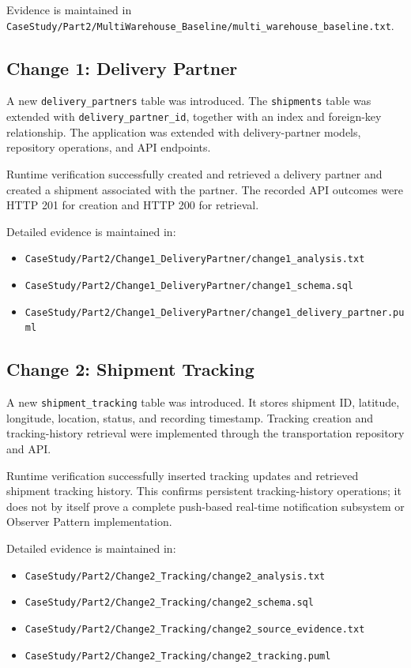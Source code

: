 \documentclass[12pt,a4paper]{article}
\begin{document}
Evidence is maintained in \texttt{CaseStudy/Part2/MultiWarehouse\_Baseline/multi\_warehouse\_baseline.txt}.

\subsection{Change 1: Delivery Partner}
A new \texttt{delivery\_partners} table was introduced. The \texttt{shipments} table was extended with \texttt{delivery\_partner\_id}, together with an index and foreign-key relationship. The application was extended with delivery-partner models, repository operations, and API endpoints.

Runtime verification successfully created and retrieved a delivery partner and created a shipment associated with the partner. The recorded API outcomes were HTTP 201 for creation and HTTP 200 for retrieval.

Detailed evidence is maintained in:
\begin{itemize}
    \item \texttt{CaseStudy/Part2/Change1\_DeliveryPartner/change1\_analysis.txt}
    \item \texttt{CaseStudy/Part2/Change1\_DeliveryPartner/change1\_schema.sql}
    \item \texttt{CaseStudy/Part2/Change1\_DeliveryPartner/change1\_delivery\_partner.puml}
\end{itemize}

\subsection{Change 2: Shipment Tracking}
A new \texttt{shipment\_tracking} table was introduced. It stores shipment ID, latitude, longitude, location, status, and recording timestamp. Tracking creation and tracking-history retrieval were implemented through the transportation repository and API.

Runtime verification successfully inserted tracking updates and retrieved shipment tracking history. This confirms persistent tracking-history operations; it does not by itself prove a complete push-based real-time notification subsystem or Observer Pattern implementation.

Detailed evidence is maintained in:
\begin{itemize}
    \item \texttt{CaseStudy/Part2/Change2\_Tracking/change2\_analysis.txt}
    \item \texttt{CaseStudy/Part2/Change2\_Tracking/change2\_schema.sql}
    \item \texttt{CaseStudy/Part2/Change2\_Tracking/change2\_source\_evidence.txt}
    \item \texttt{CaseStudy/Part2/Change2\_Tracking/change2\_tracking.puml}
\end{itemize}
\end{document}
